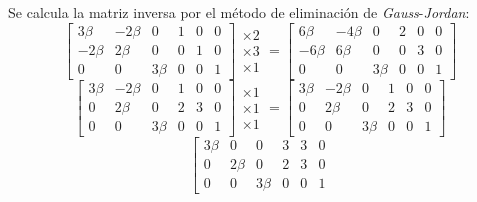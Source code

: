 \documentclass[letter,11pt]{article}
\begin{document}
\begin{enumerate}
Se calcula la matriz inversa por el método de eliminación de \emph{Gauss}-\emph{Jordan}:
\begin{equation*}
    \left[
    \begin{array}{ccc|ccc}
        3\beta & -2\beta & 0 & 1 & 0 & 0 \\
        -2\beta & 2\beta & 0 & 0 & 1 & 0 \\
        0 & 0 & 3\beta & 0 & 0 & 1
    \end{array}
    \right]
    \begin{array}{c}
        \times 2 \\
        \times 3 \\
        \times 1
    \end{array}
    =
    \left[
    \begin{array}{ccc|ccc}
        6\beta & -4\beta & 0 & 2 & 0 & 0 \\
        -6\beta & 6\beta & 0 & 0 & 3 & 0 \\
        0 & 0 & 3\beta & 0 & 0 & 1
    \end{array}
    \right]
\end{equation*}
\begin{equation*}
    \left[
    \begin{array}{ccc|ccc}
        3\beta & -2\beta & 0 & 1 & 0 & 0 \\
        0 & 2\beta & 0 & 2 & 3 & 0 \\
        0 & 0 & 3\beta & 0 & 0 & 1
    \end{array}
    \right]
    \begin{array}{c}
        \times 1 \\
        \times 1 \\
        \times 1
    \end{array}
    =
    \left[
    \begin{array}{ccc|ccc}
        3\beta & -2\beta & 0 & 1 & 0 & 0 \\
        0 & 2\beta & 0 & 2 & 3 & 0 \\
        0 & 0 & 3\beta & 0 & 0 & 1
    \end{array}
    \right]
\end{equation*}
\begin{equation*}
    \left[
    \begin{array}{ccc|ccc}
        3\beta & 0 & 0 & 3 & 3 & 0 \\
        0 & 2\beta & 0 & 2 & 3 & 0 \\
        0 & 0 & 3\beta & 0 & 0 & 1
    \end{array}

\end{equation*}
\end{enumerate}
\end{document}
